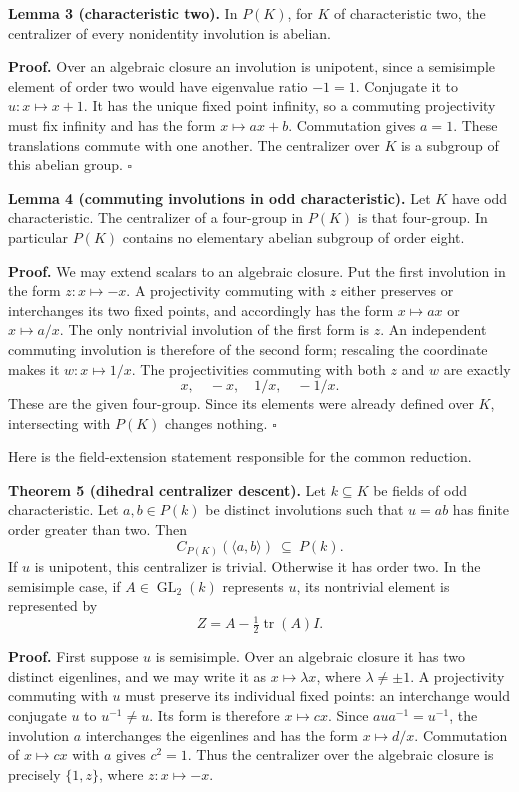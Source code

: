 \documentclass[
  11pt,
  a4paper,
]{article}
\begin{document}
\textbf{Lemma 3 (characteristic two).} In \(P(K)\), for \(K\) of
characteristic two, the centralizer of every nonidentity involution is
abelian.

\textbf{Proof.} Over an algebraic closure an involution is unipotent,
since a semisimple element of order two would have eigenvalue ratio
\(-1=1\). Conjugate it to \(u:x\mapsto x+1\). It has the unique fixed
point infinity, so a commuting projectivity must fix infinity and has
the form \(x\mapsto ax+b\). Commutation gives \(a=1\). These
translations commute with one another. The centralizer over \(K\) is a
subgroup of this abelian group. \(\square\)

\textbf{Lemma 4 (commuting involutions in odd characteristic).} Let
\(K\) have odd characteristic. The centralizer of a four-group in
\(P(K)\) is that four-group. In particular \(P(K)\) contains no
elementary abelian subgroup of order eight.

\textbf{Proof.} We may extend scalars to an algebraic closure. Put the
first involution in the form \(z:x\mapsto-x\). A projectivity commuting
with \(z\) either preserves or interchanges its two fixed points, and
accordingly has the form \(x\mapsto ax\) or \(x\mapsto a/x\). The only
nontrivial involution of the first form is \(z\). An independent
commuting involution is therefore of the second form; rescaling the
coordinate makes it \(w:x\mapsto1/x\). The projectivities commuting with
both \(z\) and \(w\) are exactly \[
 x,\quad -x,\quad 1/x,\quad -1/x.
\] These are the given four-group. Since its elements were already
defined over \(K\), intersecting with \(P(K)\) changes nothing.
\(\square\)

Here is the field-extension statement responsible for the common
reduction.

\textbf{Theorem 5 (dihedral centralizer descent).} Let \(k\subseteq K\)
be fields of odd characteristic. Let \(a,b\in P(k)\) be distinct
involutions such that \(u=ab\) has finite order greater than two. Then
\[
 C_{P(K)}(\langle a,b\rangle)\ \subseteq\ P(k).
 \tag{3}
\] If \(u\) is unipotent, this centralizer is trivial. Otherwise it has
order two. In the semisimple case, if \(A\in\operatorname{GL}_2(k)\)
represents \(u\), its nontrivial element is represented by \[
 Z=A-\tfrac12\operatorname{tr}(A)I.
 \tag{4}
\]

\textbf{Proof.} First suppose \(u\) is semisimple. Over an algebraic
closure it has two distinct eigenlines, and we may write it as
\(x\mapsto\lambda x\), where \(\lambda\ne\pm1\). A projectivity
commuting with \(u\) must preserve its individual fixed points: an
interchange would conjugate \(u\) to \(u^{-1}\ne u\). Its form is
therefore \(x\mapsto cx\). Since \(aua^{-1}=u^{-1}\), the involution
\(a\) interchanges the eigenlines and has the form \(x\mapsto d/x\).
Commutation of \(x\mapsto cx\) with \(a\) gives \(c^2=1\). Thus the
centralizer over the algebraic closure is precisely \(\{1,z\}\), where
\(z:x\mapsto-x\).
\end{document}
